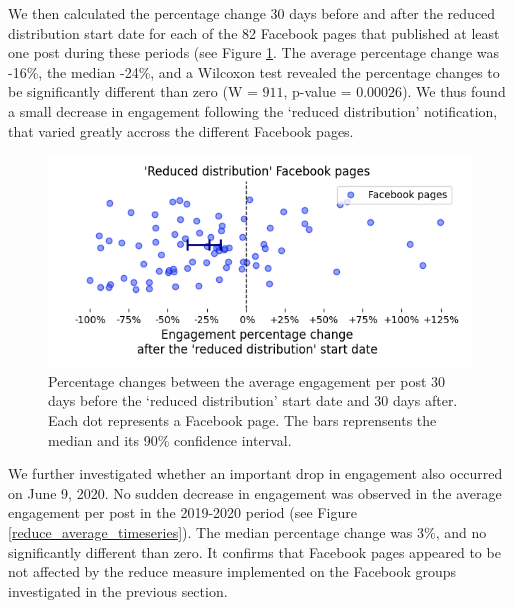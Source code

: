 \documentclass[11pt,a4paper]{article}
\begin{document}
We then calculated the percentage change 30 days before and after the reduced distribution start date for each of the 82 Facebook pages that published at least one post during these periods (see Figure \ref{reduce_percentage_change}. 
The average percentage change was -16\%, the median -24\%, and a Wilcoxon test revealed the percentage changes to be significantly different than zero (W = $911$, p-value = $0.00026$).
We thus found a small decrease in engagement following the `reduced distribution' notification, that varied greatly accross the different Facebook pages.

\begin{figure}[!h]
\centering
\includegraphics[width=\linewidth]{./../figure/reduce_percentage_change.png}
\caption{Percentage changes between the average engagement per post 30 days before the `reduced distribution' start date and 30 days after. Each dot represents a Facebook page. The bars reprensents the median and its 90\% confidence interval.}
\label{reduce_percentage_change}
\end{figure}
 
We further investigated whether an important drop in engagement also occurred on June 9, 2020. 
No sudden decrease in engagement was observed in the average engagement per post in the 2019-2020 period (see Figure \ref{reduce_average_timeseries}).
The median percentage change was 3\%, and no significantly different than zero.
It confirms that Facebook pages appeared to be not affected by the reduce measure implemented on the Facebook groups investigated in the previous section.
\end{document}
